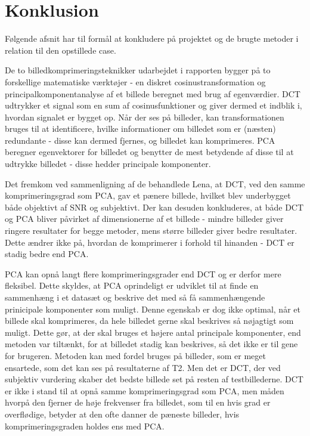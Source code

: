\chapter{Konklusion}
Følgende afsnit har til formål at konkludere på projektet og de brugte metoder i relation til den opstillede case.

De to billedkomprimeringsteknikker udarbejdet i rapporten bygger på to forskellige matematiske værktøjer - en diskret cosinustransformation og principalkomponentanalyse af et billede beregnet med brug af egenværdier. DCT udtrykker et signal som en sum af cosinusfunktioner og giver dermed et indblik i, hvordan signalet er bygget op. Når der ses på billeder, kan transformationen bruges til at identificere, hvilke informationer om billedet som er (næsten) redundante - disse kan dermed fjernes, og billedet kan komprimeres. PCA beregner egenvektorer for billedet og benytter de mest betydende af disse til at udtrykke billedet - disse hedder principale komponenter.

Det fremkom ved sammenligning af de behandlede Lena, at DCT, ved den samme komprimeringsgrad som PCA, gav et pænere billede, hvilket blev underbygget både objektivt af SNR og subjektivt.
Der kan desuden konkluderes, at både DCT og PCA bliver påvirket af dimensionerne af et billede - mindre billeder giver ringere resultater for begge metoder, mens større billeder giver bedre resultater. Dette ændrer ikke på, hvordan de komprimerer i forhold til hinanden - DCT er stadig bedre end PCA.

PCA kan opnå langt flere komprimeringsgrader end DCT og er derfor mere fleksibel. Dette skyldes, at PCA oprindeligt er udviklet til at finde en sammenhæng i et datasæt og beskrive det med så få sammenhængende prinicipale komponenter som muligt. Denne egenskab er dog ikke optimal, når et billede skal komprimeres, da hele billedet gerne skal beskrives så nøjagtigt som muligt. Dette gør, at der skal bruges et højere antal principale komponenter, end metoden var tiltænkt, for at billedet stadig kan beskrives, så det ikke er til gene for brugeren. Metoden kan med fordel bruges på billeder, som er meget ensartede, som det kan ses på resultaterne af T2. Men det er DCT, der ved subjektiv vurdering skaber det bedste billede set på resten af testbillederne. 
DCT er ikke i stand til at opnå samme komprimeringsgrad som PCA, men måden hvorpå den fjerner de høje frekvenser fra billedet, som til en hvis grad er overflødige, betyder at den ofte danner de pæneste billeder, hvis komprimeringsgraden holdes ens med PCA.

